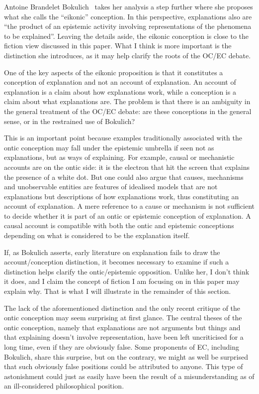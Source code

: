 \begin{artengenv}{Antoine Brandelet}
Bokulich~\parencite*{Bokulich2018} takes her analysis a step further where she proposes what she calls the ``eikonic'' conception. In this perspective, explanations also are ``the product of an epistemic activity involving representations of the phenomena to be explained''. Leaving the details aside, the eikonic conception is close to the fiction view discussed in this paper. What I think is more important is the distinction she introduces, as it may help clarify the roots of the OC/EC debate.

One of the key aspects of the eikonic proposition is that it constitutes a conception of explanation and not an account of explanation. An account of explanation is a claim about how explanations work, while a conception is a claim about what explanations are. The problem is that there is an ambiguity in the general treatment of the OC/EC debate: are these conceptions in the general sense, or in the restrained use of Bokulich?

This is an important point because examples traditionally associated with the ontic conception may fall under the epistemic umbrella if seen not as explanations, but as ways of explaining. For example, causal or mechanistic accounts are on the ontic side: it is the electron that hit the screen that explains the presence of a white dot. But one could also argue that causes, mechanisms and unobservable entities are features of idealised models that are not explanations but descriptions of how explanations work, thus constituting an account of explanation. A mere reference to a cause or mechanism is not sufficient to decide whether it is part of an ontic or epistemic conception of explanation. A causal account is compatible with both the ontic and epistemic conceptions depending on what is considered to be the explanation itself.

If, as Bokulich asserts, early literature on explanation fails to draw the account/conception distinction, it becomes necessary to examine if such a distinction helps clarify the ontic/epistemic opposition. Unlike her, I don't think it does, and I claim the concept of fiction I am focusing on in this paper may explain why. That is what I will illustrate in the remainder of this section.

The lack of the aforementioned distinction and the only recent critique of the ontic conception may seem surprising at first glance. The central theses of the ontic conception, namely that explanations are not arguments but things and that explaining doesn't involve representation, have been left uncriticised for a long time, even if they are obviously false. Some proponents of EC, including Bokulich, share this surprise, but on the contrary, we might as well be surprised that such obviously false positions could be attributed to anyone. This type of astonishment could just as easily have been the result of a misunderstanding as of an ill-considered philosophical position.


\end{artengenv}
